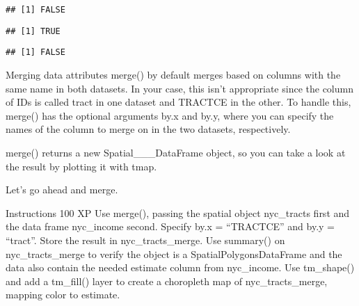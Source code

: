 \documentclass[]{article}
\newenvironment{Shaded}{\begin{snugshade}}{\end{snugshade}}
\newcommand{\CommentTok}[1]{\textcolor[rgb]{0.56,0.35,0.01}{\textit{#1}}}
\newcommand{\KeywordTok}[1]{\textcolor[rgb]{0.13,0.29,0.53}{\textbf{#1}}}
\newcommand{\NormalTok}[1]{#1}
\newcommand{\OperatorTok}[1]{\textcolor[rgb]{0.81,0.36,0.00}{\textbf{#1}}}
\newcommand{\StringTok}[1]{\textcolor[rgb]{0.31,0.60,0.02}{#1}}
\begin{document}
\begin{verbatim}
## [1] FALSE
\end{verbatim}

\begin{Shaded}
\end{Shaded}

\begin{verbatim}
## [1] TRUE
\end{verbatim}

\begin{Shaded}
\end{Shaded}

\begin{verbatim}
## [1] FALSE
\end{verbatim}

Merging data attributes merge() by default merges based on columns with
the same name in both datasets. In your case, this isn't appropriate
since the column of IDs is called tract in one dataset and TRACTCE in
the other. To handle this, merge() has the optional arguments by.x and
by.y, where you can specify the names of the column to merge on in the
two datasets, respectively.

merge() returns a new Spatial\_\_\_DataFrame object, so you can take a
look at the result by plotting it with tmap.

Let's go ahead and merge.

Instructions 100 XP Use merge(), passing the spatial object nyc\_tracts
first and the data frame nyc\_income second. Specify by.x = ``TRACTCE''
and by.y = ``tract''. Store the result in nyc\_tracts\_merge. Use
summary() on nyc\_tracts\_merge to verify the object is a
SpatialPolygonsDataFrame and the data also contain the needed estimate
column from nyc\_income. Use tm\_shape() and add a tm\_fill() layer to
create a choropleth map of nyc\_tracts\_merge, mapping color to
estimate.
\end{document}
